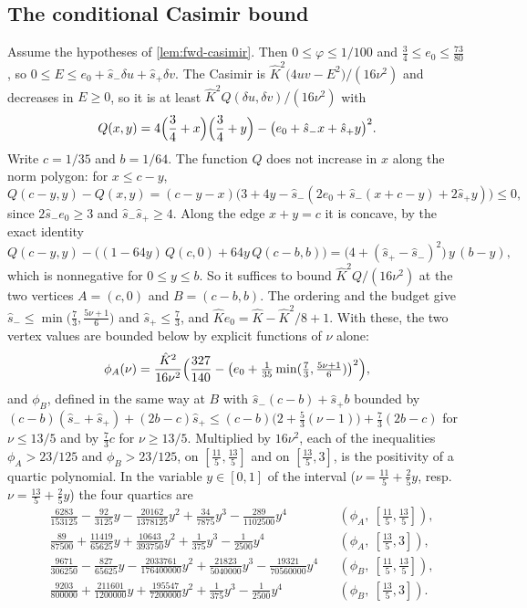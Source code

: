 \subsection{The conditional Casimir bound}\label{app:fwd-casimir}
Assume the hypotheses of \cref{lem:fwd-casimir}. Then $0\le\varphi\le1/100$ and
$\frac34\le e_0\le\frac{73}{80}$, so $0\le E\le e_0+\hat s_-\delta u+\hat s_+\delta v$. The Casimir is
$\hat K^2\bigl(4uv-E^2\bigr)/(16\nu^2)$ and decreases in $E\ge0$, so it is at least
$\hat K^2Q(\delta u,\delta v)/(16\nu^2)$ with
\[
Q(x,y)=4\Bigl(\frac34+x\Bigr)\Bigl(\frac34+y\Bigr)-\bigl(e_0+\hat s_-x+\hat s_+y\bigr)^2 .
\]
Write $c=1/35$ and $b=1/64$. The function $Q$ does not increase in $x$ along the norm polygon: for
$x\le c-y$,
\[
Q(c-y,y)-Q(x,y)=(c-y-x)\bigl(3+4y-\hat s_-(2e_0+\hat s_-(x+c-y)+2\hat s_+y)\bigr)\le0,
\]
since $2\hat s_-e_0\ge3$ and $\hat s_-\hat s_+\ge4$. Along the edge $x+y=c$ it is concave, by the
exact identity
\[
Q(c-y,y)-\bigl((1-64y)\,Q(c,0)+64y\,Q(c-b,b)\bigr)=\bigl(4+(\hat s_+-\hat s_-)^2\bigr)\,y\,(b-y),
\]
which is nonnegative for $0\le y\le b$. So it suffices to bound $\hat K^2Q/(16\nu^2)$ at the two
vertices $A=(c,0)$ and $B=(c-b,b)$. The ordering and the budget give
$\hat s_-\le\min\bigl(\frac73,\frac{5\nu+1}6\bigr)$ and $\hat s_+\le\frac73$, and
$\hat Ke_0=\hat K-\hat K^2/8+1$. With these, the two vertex values are bounded below by explicit
functions of $\nu$ alone:
\[
\phi_A(\nu)=\frac{\hat K^2}{16\nu^2}\Bigl(\frac{327}{140}-\bigl(e_0+\tfrac1{35}\min(\tfrac73,\tfrac{5\nu+1}6)\bigr)^2\Bigr),
\]
and $\phi_B$, defined in the same way at $B$ with $\hat s_-(c-b)+\hat s_+b$ bounded by
$(c-b)(\hat s_-+\hat s_+)+(2b-c)\hat s_+\le(c-b)\bigl(2+\frac53(\nu-1)\bigr)+\frac73(2b-c)$ for
$\nu\le13/5$ and by $\frac73c$ for $\nu\ge13/5$. Multiplied by $16\nu^2$, each of the inequalities
$\phi_A>23/125$ and $\phi_B>23/125$, on $[\frac{11}5,\frac{13}5]$ and on $[\frac{13}5,3]$, is the
positivity of a quartic polynomial. In the variable $y\in[0,1]$ of the interval
($\nu=\frac{11}5+\frac25y$, resp.\ $\nu=\frac{13}5+\frac25y$) the four quartics are
\begin{align*}
&\tfrac{6283}{153125}-\tfrac{92}{3125}y-\tfrac{20162}{1378125}y^2+\tfrac{34}{7875}y^3
  -\tfrac{289}{1102500}y^4 &&(\phi_A,\ [\tfrac{11}5,\tfrac{13}5]),\\
&\tfrac{89}{87500}+\tfrac{11419}{65625}y+\tfrac{10643}{393750}y^2+\tfrac1{375}y^3
  -\tfrac1{2500}y^4 &&(\phi_A,\ [\tfrac{13}5,3]),\\
&\tfrac{9671}{306250}-\tfrac{827}{65625}y-\tfrac{2033761}{176400000}y^2
  +\tfrac{21823}{5040000}y^3-\tfrac{19321}{70560000}y^4 &&(\phi_B,\ [\tfrac{11}5,\tfrac{13}5]),\\
&\tfrac{9203}{800000}+\tfrac{211601}{1200000}y+\tfrac{195547}{7200000}y^2+\tfrac1{375}y^3
  -\tfrac1{2500}y^4 &&(\phi_B,\ [\tfrac{13}5,3]).
\end{align*}
